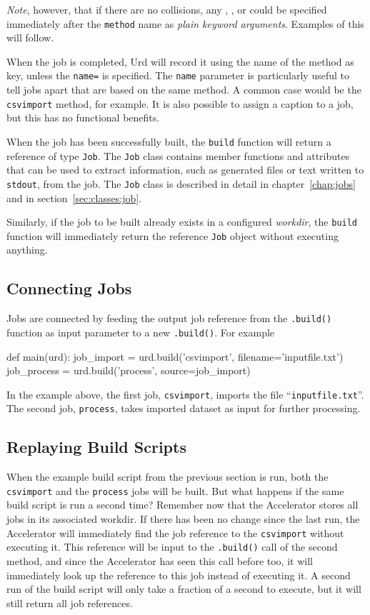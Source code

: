 \textsl{Note}, however, that  if there are no collisions, any \options, \datasets, or \jobs
could be specified immediately after the \texttt{method} name as \textsl{plain
keyword arguments}.  Examples of this will follow.

When the job is completed, Urd will record it using the name of the
method as key, unless the \texttt{name=} is specified.
The \texttt{name} parameter is particularly useful to tell jobs apart
that are based on the same method.  A common case would be
the \texttt{csvimport} method, for example.  It is also possible to
assign a caption to a job, but this has no functional benefits.

When the job has been successfully built, the \texttt{build} function
will return a reference of type \texttt{Job}.  The \texttt{Job} class
contains member functions and attributes that can be used to extract
information, such as generated files or text written
to \texttt{stdout}, from the job.  The \texttt{Job} class is described
in detail in chapter~\ref{chap:jobs} and in section~\ref{sec:classes:job}.

Similarly, if the job to be built already exists in a
configured \textsl{workdir}, the \texttt{build} function will
immediately return the reference \texttt{Job} object without executing
anything.



\subsection{Connecting Jobs}
Jobs are connected by feeding the output job reference from
the \texttt{.build()} function as input parameter to a
new \texttt{.build()}.  For example
\begin{python}
def main(urd):
    job_import  = urd.build('csvimport', filename='inputfile.txt')
    job_process = urd.build('process',   source=job_import)
\end{python}
In the example above, the first job, \texttt{csvimport}, imports the
file ``\texttt{inputfile.txt}''.  The second job, \texttt{process},
takes imported dataset as input for further processing.



\subsection{Replaying Build Scripts}

When the example build script from the previous section is run, both
the \texttt{csvimport} and the \texttt{process} jobs will be built.
But what happens if the same build script is run a second time?
Remember now that the Accelerator stores all jobs in its associated
workdir.  If there has been no change since the last run, the
Accelerator will immediately find the job reference to
the \texttt{csvimport} without executing it.  This reference will be
input to the \texttt{.build()} call of the second method, and since
the Accelerator has seen this call before too, it will immediately
look up the reference to this job instead of executing it.  A second
run of the build script will only take a fraction of a second to
execute, but it will still return all job references.

